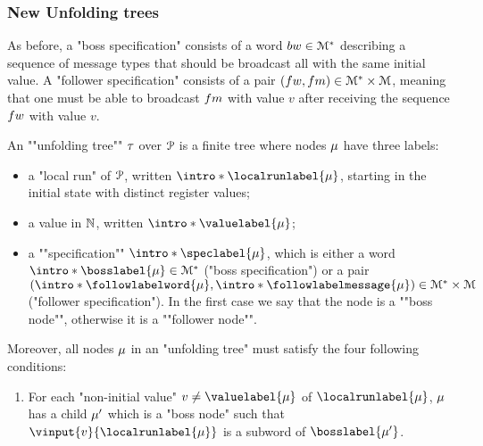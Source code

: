 \subsubsection{New Unfolding trees}
\label{sec:decidability-tree-unfoldings}

As before, a "boss specification" consists of a word $\bossspec \in \messages^\ast$ describing a sequence of message types that should be broadcast all with the same initial value. A "follower specification" consists of a pair $(\followwordspec, \followmessagespec) \in \messages^*\times \messages$, meaning that one must be able to broadcast $\followmessagespec$ with value $v$ after receiving the sequence $\followwordspec$ with value $v$. 

\begin{definition}
	\label{def:unfolding_tree}
	\AP An ""unfolding tree"" $\tau$ over $\mathcal{P}$ is
	a finite tree where nodes $\mu$ have three labels:
	\begin{itemize}
		\item a "local run" of $\mathcal{P}$, written $\intro*\localrunlabel{\node}$, starting in the initial state with distinct register values;
		
		\item a value in $\mathbb{N}$, written $\intro*\valuelabel{\node}$;
		
		\item a ""specification"" $\intro*\speclabel{\node}$, which is either a word $\intro*\bosslabel{\node} \in \messages^*$ ("boss specification") or a pair $(\intro*\followlabelword{\node}, \intro*\followlabelmessage{\node}) \in \messages^* \times \messages$ ("follower specification"). In the first case we say that the node is a ""boss node"", otherwise it is a ""follower node"".
	\end{itemize} 
	Moreover, all nodes $\mu$ in an "unfolding tree" must satisfy the four following conditions:
	\begin{enumerate}[label= (\roman*), ref=(\roman*)]
		\item \label{item:condition1_non_initial_value} For each "non-initial value" $\aval \ne \valuelabel{\node}$ of $\localrunlabel{\node}$, $\mu$ has a child $\mu'$ which is a "boss node" such that $\vinput{\aval}{\localrunlabel{\node}}$ is a subword of $\bosslabel{\node'}$.
		

\end{enumerate}
\end{definition}
